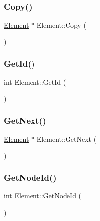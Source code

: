 \subsubsection{\texorpdfstring{Copy()}{Copy()}}
{\footnotesize\ttfamily \hyperlink{class_element}{Element} $\ast$ Element\+::\+Copy (\begin{DoxyParamCaption}{ }\end{DoxyParamCaption})}

\mbox{\label{class_element_a1192c24be1306b12c253b24abd03eeb9}} 
\subsubsection{\texorpdfstring{Get\+Id()}{GetId()}}
{\footnotesize\ttfamily int Element\+::\+Get\+Id (\begin{DoxyParamCaption}{ }\end{DoxyParamCaption})}

\mbox{\label{class_element_aa2e180ec42309fa35851a8e6ea5d7b7d}} 
\subsubsection{\texorpdfstring{Get\+Next()}{GetNext()}}
{\footnotesize\ttfamily \hyperlink{class_element}{Element} $\ast$ Element\+::\+Get\+Next (\begin{DoxyParamCaption}{ }\end{DoxyParamCaption})}

\mbox{\label{class_element_a7c6a9ed71c86ae116e289ad4337b3bce}} 
\subsubsection{\texorpdfstring{Get\+Node\+Id()}{GetNodeId()}}
{\footnotesize\ttfamily int Element\+::\+Get\+Node\+Id (\begin{DoxyParamCaption}{ }\end{DoxyParamCaption})}

\mbox{\label{class_element_a2697e4bfa4e1a68413fe04acc95418ef}} 
